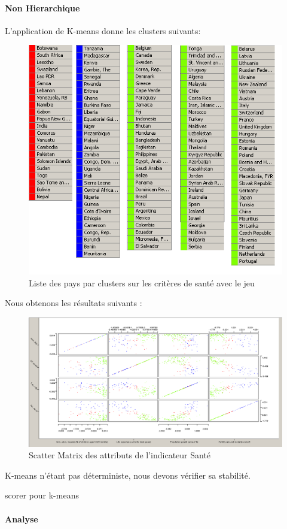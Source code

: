 \paragraph{Non Hierarchique}
L'application de K-means donne les clusters suivants: 

\begin{figure}[H]
	\begin{center}
		\includegraphics[scale=0.5]{Image/TableViewSanteNoMissing2}
		\caption{Liste des pays par clusters sur les critères de santé avec le jeu \jeuc}
	\end{center}
\end{figure}


Nous obtenons les résultats suivants : 

\begin{figure}[H]
	\begin{center}
		\includegraphics[scale=0.5]{Image/ScatterMatrixSanteNoMissing2}
		\caption{Scatter Matrix des attributs de l'indicateur Santé \jeuc}
	\end{center}
\end{figure}

K-means n'étant pas déterministe, nous devons vérifier sa stabilité.

\begin{Huge}


scorer pour k-means 
\end{Huge} 


\paragraph{Analyse}




